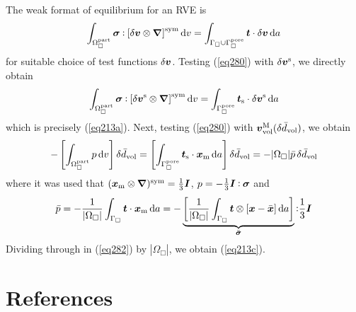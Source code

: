 \documentclass[10pt,a4paper]{article}
\newcommand{\fluid}{\mathrm{part}}
\newcommand{\pore}{\mathrm{pore}}
\newcommand{\surf}{\mathrm{s}}
\begin{document}
The weak format of equilibrium for an RVE is
\begin{equation}
    \int_{\Omega^\fluid_\Box} \ts{\sigma} \dprod \left[\delta \ta{v}\outerp\diff\right]^\sym \dif v =
    \int_{\Gamma_\Box\cup\Gamma_\Box^\pore} \ta{t} \cdot \delta\ta{v} \dif a
\label{eq280}
\end{equation}
for suitable choice of test functions $\delta \boldsymbol{v}$. Testing (\ref{eq280}) with $\delta \boldsymbol{v}^{\mathrm{s}}$, we directly obtain
\begin{equation}
    \int_{\Omega^\fluid_\Box} \ts{\sigma} \dprod \left[\delta \ta{v}^\fluct\outerp\diff\right]^\sym \dif v =
    \int_{\Gamma_\Box^\pore} \ta{t}_\surf \cdot \delta\ta{v}^\fluct \dif a
\label{eq281}
\end{equation}
which is precisely (\ref{eq213a}). Next, testing (\ref{eq280}) with $\boldsymbol{v}^{\mathrm{M}}_{\mathrm{vol}}(\delta\bar{d}_{\mathrm{vol}})$, we obtain 
\begin{equation}
    - \left[\int_{\Omega^\fluid_\Box} p  \dif v \right]\delta\bar{d}_\vol =
    \left[\int_{\Gamma_\Box^\pore} \ta{t}_\surf \cdot \ta{x}_\mean \dif a\right]\delta\bar{d}_\vol =
    - |\Omega_\Box|\bar{p}\,\delta\bar{d}_\vol
\label{eq282}
\end{equation}
where it was used that $(\boldsymbol{x}_{\mathrm{m}}\mathbin{\otimes}\boldsymbol{\nabla})^{\mathrm{sym}}=\frac{1}{3}\boldsymbol{I}$, $p=-\frac{1}{3}\boldsymbol{I}\mathbin{\vcentcolon}\boldsymbol{\sigma}$ and 
\begin{equation}
    \bar{p} = - \frac{1}{|\Omega_\Box|} \int_{\Gamma_\Box} \boldsymbol{t} \cdot \boldsymbol{x}_{\mathrm{m}} \operatorname{d \!} a =
     - \underbrace{\left[\frac{1}{|\Omega_\Box|} \int_{\Gamma_\Box} \boldsymbol{t} \mathbin{\otimes} [\boldsymbol{x}-\bar{\boldsymbol{x}}] \operatorname{d \!} a\right]}_{\bar{\boldsymbol{\sigma}}}  \mathbin{\vcentcolon} \frac{1}{3}\boldsymbol{I}
\label{eq282}
\end{equation}
Dividing through in (\ref{eq282}) by $|\Omega_\Box|$, we obtain (\ref{eq213c}).


\section{References}



\end{document}
